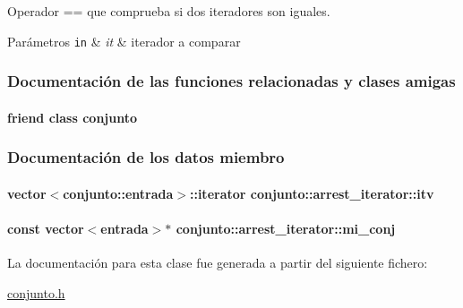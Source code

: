 Operador == que comprueba si dos iteradores son iguales. 


\begin{DoxyParams}[1]{Parámetros}
\mbox{\tt in}  & {\em it} & iterador a comparar \\
\hline
\end{DoxyParams}


\subsubsection{Documentación de las funciones relacionadas y clases amigas}
\hypertarget{classconjunto_1_1arrest__iterator_a42fdcda39c77eabd7380e29fcdbe5dd2}{
\paragraph[{conjunto}]{\setlength{\rightskip}{0pt plus 5cm}friend class {\bf conjunto}\hspace{0.3cm}{\ttfamily [friend]}}}\label{classconjunto_1_1arrest__iterator_a42fdcda39c77eabd7380e29fcdbe5dd2}


\subsubsection{Documentación de los datos miembro}
\hypertarget{classconjunto_1_1arrest__iterator_ad5f1edd37d042374db6a137ec8de3535}{
\paragraph[{itv}]{\setlength{\rightskip}{0pt plus 5cm}vector$<${\bf conjunto\-::entrada}$>$\-::{\bf iterator} conjunto\-::arrest\-\_\-iterator\-::itv\hspace{0.3cm}{\ttfamily [private]}}}\label{classconjunto_1_1arrest__iterator_ad5f1edd37d042374db6a137ec8de3535}
\hypertarget{classconjunto_1_1arrest__iterator_a380864585c393179b6b33e89b0f30da0}{
\paragraph[{mi\-\_\-conj}]{\setlength{\rightskip}{0pt plus 5cm}const vector$<${\bf entrada}$>$$\ast$ conjunto\-::arrest\-\_\-iterator\-::mi\-\_\-conj\hspace{0.3cm}{\ttfamily [private]}}}\label{classconjunto_1_1arrest__iterator_a380864585c393179b6b33e89b0f30da0}


La documentación para esta clase fue generada a partir del siguiente fichero\-:\begin{DoxyCompactItemize}
\item 
\hyperlink{conjunto_8h}{conjunto.\-h}\end{DoxyCompactItemize}

